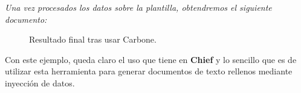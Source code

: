 \textit{Una vez procesados los datos sobre la plantilla, obtendremos el siguiente documento:}
\begin{figure}[H]
	\centering
	\caption{Resultado final tras usar Carbone. \label{fig:figura12}}
\end{figure}

Con este ejemplo, queda claro el uso que tiene en \textbf{Chief} y lo sencillo que es de utilizar esta herramienta para generar documentos de texto rellenos mediante inyección de datos.

	
